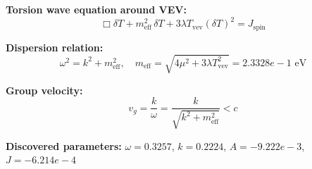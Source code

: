 
\textbf{Torsion wave equation around VEV:}
\begin{equation}
  \Box \delta T + m_{\text{eff}}^2 \, \delta T + 3\lambda T_{\text{vev}} (\delta T)^2 = J_{\text{spin}}
\end{equation}

\textbf{Dispersion relation:}
\begin{equation}
  \omega^2 = k^2 + m_{\text{eff}}^2, \quad
  m_{\text{eff}} = \sqrt{4\mu^2 + 3\lambda T_{\text{vev}}^2} = 2.3328e-1 \text{ eV}
\end{equation}

\textbf{Group velocity:}
\begin{equation}
  v_g = \frac{k}{\omega} = \frac{k}{\sqrt{k^2 + m_{\text{eff}}^2}} < c
\end{equation}

\textbf{Discovered parameters:}
$\omega = 0.3257$, \quad
$k = 0.2224$, \quad
$A = -9.222e-3$, \quad
$J = -6.214e-4$
